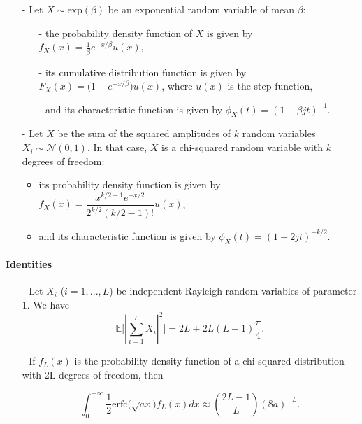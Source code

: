 \documentclass [a4paper, 11pt] {article}
\begin{document}
\begin{reminder}
\begin{itemize}
\item[-] Let $X \sim \text{exp}(\beta)$ be an exponential random variable of mean $\beta$:

    \begin{itemize}
    \item[-] the probability density function of $X$ is given by $f_X(x) = \frac{1}{\beta}e^{-x/\beta}u(x)$,
    \item[-] its cumulative distribution function is given by $F_X(x) = \big(1 - e^{-x/\beta}\big)u(x)$, where $u(x)$ is the step function,
    \item[-] and its characteristic function is given by $\phi_X(t) = (1-\beta jt)^{-1}$.
    \end{itemize}

\item[-] Let $X$ be the sum of the squared amplitudes of $k$ random variables $X_i \sim \mathcal{N}(0,1)$. In that case, $X$ is a chi-squared random variable with $k$ degrees of freedom:

    \begin{itemize}
        \item its probability density function is given by $f_X(x) = \dfrac{x^{k/2-1}e^{-x/2}}{2^{k/2}(k/2-1)!} u(x)$,
        \item and its characteristic function is given by $\phi_X(t) = (1-2jt)^{-k/2}$.
    \end{itemize}
\end{itemize}


\paragraph{Identities}

\begin{itemize}
\item[-] Let $X_i$ ($i=1,...,L$) be independent Rayleigh random variables of parameter $1$. We have
    \begin{equation}
    \mathbb{E}\Big[ |\sum_{i=1}^{L} X_i|^2 \Big] = 2L + 2L(L-1)\frac{\pi}{4}.
    \end{equation}

\item[-] If $f_L(x)$ is the probability density function of a chi-squared distribution with 2L degrees of freedom, then

    \begin{equation}
    \int_{0}^{+\infty}\frac{1}{2}\text{erfc}\big(\sqrt{ax}\big)f_L(x)dx \approx \binom{2L-1}{L} (8a)^{-L}.
    \end{equation}

\end{itemize}

    \end{reminder}
\end{document}
